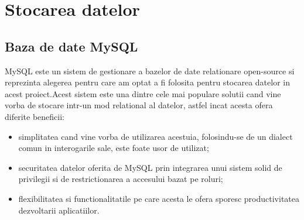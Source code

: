 \section{Stocarea datelor}

 \subsection*{Baza de date MySQL}
	MySQL este un sistem de gestionare a bazelor de date relationare open-source si reprezinta alegerea pentru care am optat a fi folosita pentru stocarea datelor in acest proiect.Acest sistem este una dintre cele mai populare solutii cand vine vorba de stocare intr-un mod relational al datelor, astfel incat acesta ofera diferite beneficii: 
	\begin{itemize}
		
		\item simplitatea cand vine vorba de utilizarea acestuia, folosindu-se de un dialect comun in interogarile sale, este foate usor de utilizat;
		
		\item securitatea datelor oferita de MySQL prin integrarea unui sistem solid de privilegii si de restrictionarea a accesului bazat pe roluri;
		
		\item flexibilitatea si functionalitatile pe care acesta le ofera sporesc productivitatea dezvoltarii aplicatiilor.
	\end{itemize} 
 
